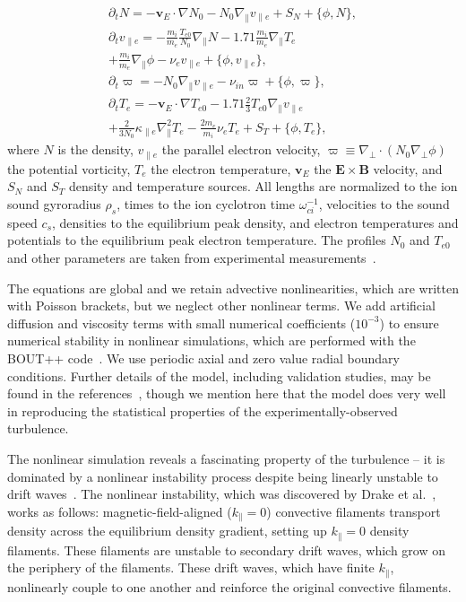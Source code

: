 \documentclass[letter,scriptaddress,twocolumn, prl,showkeys]{revtex4}
\def\beqar{\begin{eqnarray}}
\def\eeqar{\end{eqnarray}}
\def\para{\parallel}
\newcommand{\pdt}{\partial_t}
\def\grad{\nabla}
\newcommand{\gradpar}{\grad_\parallel}
\newcommand{\gradperp}{\grad_\perp}
\newcommand{\vpe}{v_{\parallel e}}
\newcommand{\nue}{\nu_{e}}
\newcommand{\nuin}{\nu_{in}}
\newcommand{\kpe}{\kappa_{\parallel e}}
\newcommand{\fmie}{\frac{m_i}{m_e}}
\begin{document}
\beqar
\label{ni_eq}
\pdt N = - {\mathbf v_E} \cdot \grad N_0 - N_0 \gradpar \vpe + S_N + \{\phi,N\}, \\
\label{ve_eq}
\pdt \vpe = - \fmie \frac{T_{e0}}{N_0} \gradpar N - 1.71 \fmie \gradpar T_e  \nonumber \\
+ \fmie \gradpar \phi - \nue \vpe + \{\phi,\vpe \}, \\
\label{rho_eq}
\pdt \varpi = - N_0 \gradpar \vpe  - \nuin \varpi + \{\phi,\varpi \}, \\
\label{te_eq}
\pdt T_e = - {\mathbf v_E} \cdot \grad T_{e0} - 1.71 \frac{2}{3} T_{e0} \gradpar \vpe \nonumber \\
+ \frac{2}{3 N_0} \kpe \gradpar^2 T_e  - \frac{2 m_e}{m_i} \nue T_e  +  S_T + \{\phi,T_e\},
\eeqar
where $N$ is the density, $\vpe$ the parallel electron velocity, $\varpi \equiv \gradperp \cdot (N_0 \gradperp \phi)$ the potential vorticity,
$T_e$ the electron temperature, ${\mathbf v_E}$ the ${\mathbf E} \times {\mathbf B}$ velocity, and $S_N$ and $S_T$ density and temperature sources. All lengths are
normalized to the ion sound gyroradius $\rho_s$, times to the ion cyclotron time $\omega_{ci}^{-1}$, velocities to the sound speed $c_s$, 
densities to the equilibrium peak density, and electron temperatures and potentials to the equilibrium peak electron temperature. 
The profiles $N_0$ and $T_{e0}$ and other parameters are taken from experimental measurements~\cite{schaffner2012,friedman2012b,friedman2013}. 

The equations are global and we retain advective nonlinearities, which are written with Poisson brackets, but we neglect other nonlinear terms. 
We add artificial diffusion and viscosity terms with small numerical coefficients ($10^{-3}$)
to ensure numerical stability in nonlinear simulations, which are performed with the BOUT++ code~\cite{dudson2009}. We use periodic axial and zero value radial 
boundary conditions. Further details of the model, including validation studies, may be found in the references~\cite{Popovich2010a,Popovich2010b,Umansky2011,friedman2012b,friedman2013},
though we mention here that the model does very well in reproducing the statistical properties of the experimentally-observed turbulence.

The nonlinear simulation reveals a fascinating property of the turbulence -- 
it is dominated by a nonlinear instability process despite being linearly unstable to drift waves~\cite{friedman2012b,friedman2013}.
The nonlinear instability, which was discovered by Drake et al.~\cite{drake1995}, works as follows: 
magnetic-field-aligned ($k_\para=0$) convective filaments transport density across the equilibrium density gradient, setting up $k_\para=0$ density filaments. 
These filaments are unstable to secondary drift waves, which grow on the periphery of the filaments. 
These drift waves, which have finite $k_\para$, nonlinearly couple to one another and reinforce the original convective filaments.
\end{document}
